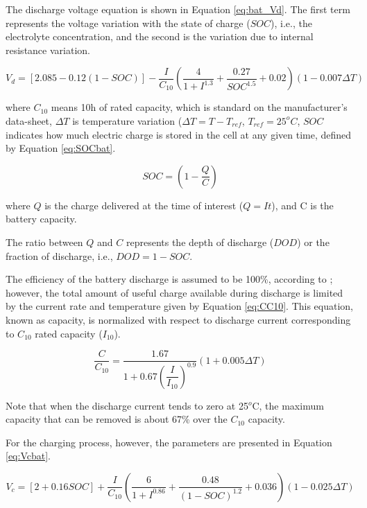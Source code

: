 The discharge voltage equation is shown in Equation \ref{eq:bat_Vd}. The first term represents the voltage variation with the state of charge ($ SOC $), i.e., the electrolyte concentration, and the second is the variation due to internal resistance variation.

\begin{equation}
\label{eq:bat_Vd}
V_{d} = \left[ 2.085-0.12(1-SOC) \right] - \dfrac{I}{C_{10}} \left( \dfrac{4}{1+I^{1.3}} + \dfrac{0.27}{SOC^{1.5}}+0.02 \right) (1-0.007 \Delta T)
\end{equation}

\noindent where $ C_{10} $ means 10h of rated capacity, which is standard on the manufacturer's data-sheet, $ \Delta T $ is temperature variation ($ \Delta T=T-T_{ref} $, $ T_{ref}=25^{o}C $, $ SOC $ indicates how much electric charge is stored in the cell at any given time, defined by Equation \ref{eq:SOCbat}.

\begin{equation}
\label{eq:SOCbat}
SOC = \left( 1 - \dfrac{Q}{C} \right) 
\end{equation}

\noindent where $ Q $ is the charge delivered at the time of interest ($ Q=It $), and C is the battery capacity.

The ratio between $ Q $ and $ C $ represents the depth of discharge ($ DOD $) or the fraction of discharge, i.e., $ DOD=1-SOC $.

The efficiency of the battery discharge is assumed to be 100\%, according to \cite{Copetti}; however, the total amount of useful charge available during discharge is limited by the current rate and temperature given by Equation \ref{eq:CC10}. This equation, known as capacity, is normalized with respect to discharge current corresponding to $ C_{10} $ rated capacity ($ I_{10} $).

\begin{equation}
\label{eq:CC10}
\dfrac{C}{C_{10}} = \dfrac{1.67}{1+0.67 \left( \dfrac{I}{I_{10}} \right)^{0.9} }(1+0.005 \Delta T)
\end{equation}

Note that when the discharge current tends to zero at 25$^{o}$C, the maximum capacity that can be removed is about 67\% over the $C_{10}$ capacity.

For the charging process, however, the parameters are presented in Equation \ref{eq:Vcbat}.

\begin{equation}
\label{eq:Vcbat}
V_{c} = [2+0.16SOC]+ \dfrac{I}{C_{10}} \left( \dfrac{6}{1+I^{0.86}} + \dfrac{0.48}{(1-SOC)^{1.2}} + 0.036  \right) (1-0.025 \Delta T)
\end{equation}

